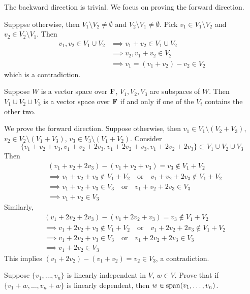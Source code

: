 \begin{solution}
The backward direction is trivial. We focus on proving the forward direction.

Supppse otherwise, then $V_1\setminus V_2\neq\emptyset$ and $V_2\setminus V_1\neq\emptyset$. Pick $v_1\in V_1\setminus V_2$ and $v_2\in V_2\setminus V_1$. Then
\begin{align*}
v_1,v_2\in V_1\cup V_2&\implies v_1+v_2\in V_1\cup V_2\\
&\implies v_2,v_1+v_2\in V_2\\
&\implies v_1=(v_1+v_2)-v_2\in V_2
\end{align*}
which is a contradiction.
\end{solution}

\begin{prbm}
Suppose $W$ is a vector space over $\mathbf F$, $V_1,V_2,V_3$ are subspaces of $W$. Then $V_1\cup V_2\cup V_3$ is a vector space over $\mathbf F$ if and only if one of the $V_i$ contains the other two.
\end{prbm}

\begin{solution}
We prove the forward direction. Suppose otherwise, then $v_1\in V_1\setminus(V_2+V_3)$, $v_2\in V_2\setminus(V_1+V_3)$, $v_3\in V_3\setminus(V_1+V_2)$. Consider
\[\{v_1+v_2+v_3,v_1+v_2+2v_3,v_1+2v_2+v_3,v_1+2v_2+2v_3\}\subset V_1\cup V_2\cup V_3\]
Then
\begin{align*}
&(v_1+v_2+2v_3)-(v_1+v_2+v_3)=v_3\notin V_1+V_2\\
&\implies v_1+v_2+v_3\notin V_1+V_2\quad\text{or}\quad v_1+v_2+2v_3\notin V_1+V_2\\
&\implies v_1+v_2+v_3\in V_3\quad\text{or}\quad v_1+v_2+2v_3\in V_3\\
&\implies v_1+v_2\in V_3
\end{align*}
Similarly,
\begin{align*}
&(v_1+2v_2+2v_3)-(v_1+2v_2+v_3)=v_3\notin V_1+V_2\\
&\implies v_1+2v_2+v_3\notin V_1+V_2\quad\text{or}\quad v_1+2v_2+2v_3\notin V_1+V_2\\
&\implies v_1+2v_2+v_3\in V_3\quad\text{or}\quad v_1+2v_2+2v_3\in V_3\\
&\implies v_1+2v_2\in V_3
\end{align*}
This implies $(v_1+2v_2)-(v_1+v_2)=v_2\in V_3$, a contradiction.
\end{solution}

\begin{prbm}
Suppose $\{v_1,\dots,v_n\}$ is linearly independent in $V$, $w\in V$. Prove that if $\{v_1+w,\dots,v_n+w\}$ is linearly dependent, then $w\in\operatorname{span}(v_1,\dots,v_n)$.
\end{prbm}

